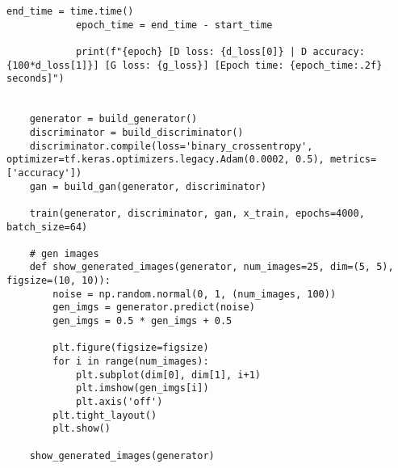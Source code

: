 \begin{lstlisting}[style=mypython, caption=Apply Animal Faces-HQ Dataset]
            end_time = time.time()
            epoch_time = end_time - start_time

            print(f"{epoch} [D loss: {d_loss[0]} | D accuracy: {100*d_loss[1]}] [G loss: {g_loss}] [Epoch time: {epoch_time:.2f} seconds]")

    
    generator = build_generator()
    discriminator = build_discriminator()
    discriminator.compile(loss='binary_crossentropy', optimizer=tf.keras.optimizers.legacy.Adam(0.0002, 0.5), metrics=['accuracy'])
    gan = build_gan(generator, discriminator)

    train(generator, discriminator, gan, x_train, epochs=4000, batch_size=64)

    # gen images
    def show_generated_images(generator, num_images=25, dim=(5, 5), figsize=(10, 10)):
        noise = np.random.normal(0, 1, (num_images, 100))
        gen_imgs = generator.predict(noise)
        gen_imgs = 0.5 * gen_imgs + 0.5

        plt.figure(figsize=figsize)
        for i in range(num_images):
            plt.subplot(dim[0], dim[1], i+1)
            plt.imshow(gen_imgs[i])
            plt.axis('off')
        plt.tight_layout()
        plt.show()

    show_generated_images(generator)
\end{lstlisting}